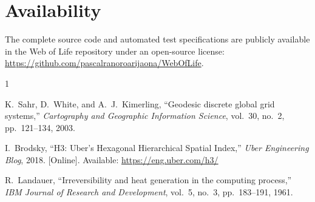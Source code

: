 \documentclass[10pt,journal,compsoc]{IEEEtran}
\begin{document}
\section*{Availability}
The complete source code and automated test specifications are publicly available in the Web of Life repository under an open-source license: \url{https://github.com/pascalranoroarijaona/WebOfLife}.


\begin{thebibliography}{1}

K.~Sahr, D.~White, and A.~J.~Kimerling, ``Geodesic discrete global grid systems,'' \emph{Cartography and Geographic Information Science}, vol.~30, no.~2, pp.~121--134, 2003.

I.~Brodsky, ``H3: Uber's Hexagonal Hierarchical Spatial Index,'' \emph{Uber Engineering Blog}, 2018. [Online]. Available: \url{https://eng.uber.com/h3/}

R.~Landauer, ``Irreversibility and heat generation in the computing process,'' \emph{IBM Journal of Research and Development}, vol.~5, no.~3, pp.~183--191, 1961.

\end{thebibliography}
\end{document}
